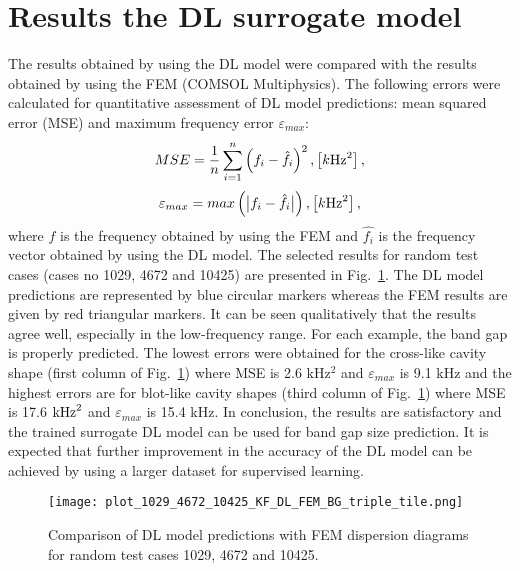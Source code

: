 \documentclass[11pt,a4paper]{report}
\begin{document}
\begin{sloppypar}
		\section{Results the DL surrogate model}
		The results obtained by using the DL model were compared with the results obtained by using the FEM (COMSOL Multiphysics). The following errors were calculated for quantitative assessment of DL model predictions: mean squared error (MSE) and maximum frequency error \(\varepsilon_{max}\):
		\begin{equation}
			MSE=\frac{1}{n}\sum_{i=1}^{n}\left( f_i - \hat{f_i}\right)^2, \left[k\textup{Hz}^2\right],
		\end{equation}	
		\begin{equation}
			\varepsilon_{max}=max\left(\big |f_i - \hat{f_i}\big |\right), \left[k\textup{Hz}^2\right],
		\end{equation}
		where \(f\) is the frequency obtained by using the FEM and \(\hat{f_i}\) is the frequency vector obtained by using the DL model.
		The selected results for random test cases (cases no 1029, 4672 and 10425) are presented in Fig.~\ref{fig:comparision}. The DL model predictions are represented by blue circular markers whereas the FEM results are given by red triangular markers. It can be seen qualitatively that the results agree well, especially in the low-frequency range. For each example, the band gap is properly predicted. The lowest errors were obtained for the cross-like cavity shape (first column of Fig.~\ref{fig:comparision}) where MSE is 2.6 kHz\(^2\) and \(\varepsilon_{max}\) is 9.1 kHz and the highest errors are for blot-like cavity shapes (third column of Fig.~\ref{fig:comparision}) where MSE is 17.6 \(\textup{kHz}^2\) and \(\varepsilon_{max}\) is 15.4 kHz. In conclusion, the results are satisfactory and the trained surrogate DL model can be used for band gap size prediction. It is expected that further improvement in the accuracy of the DL model can be achieved by using a larger dataset for supervised learning.
		\begin{figure}[ht!]
			\centering
			\texttt{[image: plot\_1029\_4672\_10425\_KF\_DL\_FEM\_BG\_triple\_tile.png]}
			\caption{Comparison of DL model predictions with FEM dispersion diagrams for random test cases 1029, 4672 and 10425.}
			\label{fig:comparision}
		\end{figure}
		

\end{sloppypar}
\end{document}
